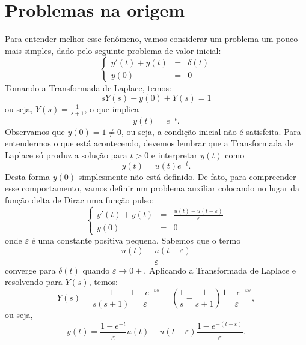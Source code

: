 \documentclass[a4paper,10pt]{book}
\begin{document}
 \section{Problemas na origem}\label{problemas_na_origem}
 Para entender melhor esse fenômeno, vamos considerar um problema um pouco mais simples, dado pelo seguinte problema de valor inicial:
\begin{equation*}
\left\{
\begin{array}{rcl}
y'(t)+y(t)&=&\delta(t)\\
y(0)&=&0
\end{array}
\right.
\end{equation*}
Tomando a Transformada de Laplace, temos:
\begin{equation*}
sY(s)-y(0)+Y(s)=1
\end{equation*}
ou seja, $Y(s)=\frac{1}{s+1}$, o que implica
\begin{equation}y(t)=e^{-t}.\end{equation}
Observamos que $y(0)=1\neq 0$, ou seja, a condição inicial não é satisfeita.
Para entendermos o que está acontecendo, devemos lembrar que a Transformada de Laplace só produz a solução para $t>0$ e interpretar $y(t)$ como
\begin{equation}y(t)=u(t)e^{-t}.\end{equation}
Desta forma $y(0)$ simplesmente não está definido. De fato, para compreender esse comportamento, vamos definir um problema auxiliar colocando no lugar da função delta de Dirac uma função pulso:
\begin{equation*}
\left\{
\begin{array}{rcl}
y'(t)+y(t)&=&\frac{u(t)-u(t-\varepsilon)}{\varepsilon}\\
y(0)&=&0
\end{array}
\right.
\end{equation*}
onde $\varepsilon$ é uma constante positiva pequena. Sabemos que o termo \begin{equation}\frac{u(t)-u(t-\varepsilon)}{\varepsilon}\end{equation} converge para $\delta(t)$ quando $\varepsilon \to 0+$. Aplicando a Transformada de Laplace e resolvendo para $Y(s)$, temos:
\begin{equation}Y(s)=\frac{1}{s(s+1)}\frac{1-e^{-\varepsilon s}}{\varepsilon}=\left(\frac{1}{s}-\frac{1}{s+1}\right)\frac{1-e^{-\varepsilon s}}{\varepsilon},\end{equation}
ou seja,
\begin{equation}y(t)=\frac{1-e^{-t}}{\varepsilon}u(t)-u(t-\varepsilon)\frac{1-e^{-(t-\varepsilon)}}{\varepsilon}.\end{equation}
\end{document}
